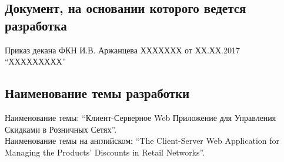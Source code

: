 \subsection{Документ, на основании которого ведется разработка}
Приказ декана ФКН И.В. Аржанцева
\textnumero ХХХХХХХ от ХХ.ХХ.2017 ``ХХХХХХХХХ''

\subsection{Наименование темы разработки}
Наименование темы: ``Клиент-Серверное Web Приложение для Управления Скидками в Розничных Сетях''. \\
Наименование темы на английском: ``The Client-Server Web Application for Managing the Products' Discounts in Retail Networks''. \\
